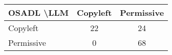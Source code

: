 \begin{tabular}{l|cc}\hline
	\textbf{OSADL \textbackslash LLM} & Copyleft & Permissive\\\hline
	Copyleft & 22 & 24\\
	Permissive & 0 & 68\\\hline
\end{tabular}
